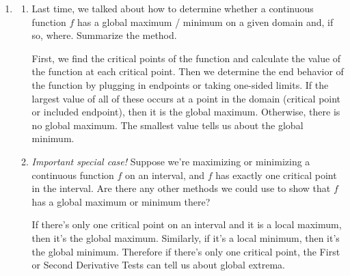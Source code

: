 \documentclass{article}
\begin{document}
\begin{enumerate}
\item  
  \begin{enumerate}
  \item


    \begin{problem}[\vfill]
      Last time, we talked about how to determine whether a continuous function $f$ has a global maximum / minimum on a given domain and, if so, where. Summarize the method.
    \end{problem}

    \begin{solution}
      First, we find the critical points of the function and calculate the value of
      the function at each critical point. Then we determine the end behavior of the function
      by plugging in endpoints or taking one-sided limits. If the largest value of all
      of these occurs at a point in the domain (critical point or included endpoint), then
      it is the global maximum. Otherwise, there is no global maximum. The smallest value
      tells us about the global minimum.
    \end{solution}

  \item


    \begin{problem}[\vfill\newpage]
      \emph{Important special case!} Suppose we're maximizing or minimizing a continuous function $f$ on an interval, and $f$ has exactly one critical point in the interval. Are there any other methods we could use to show that $f$ has a global maximum or minimum there?
    \end{problem}

    \begin{solution}
      If there's only one critical point on an interval and it is a local maximum,
      then it's the global maximum. Similarly, if it's a local minimum, then
      it's the global minimum. Therefore if there's only one critical point,
      the First or Second Derivative Tests can tell us about global extrema.
    \end{solution}


\end{enumerate}
\end{enumerate}
\end{document}
